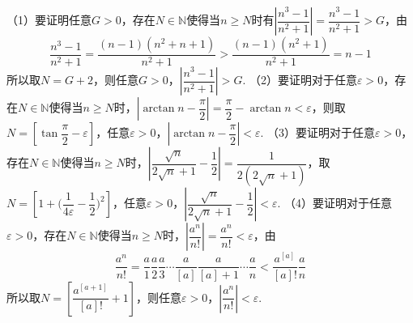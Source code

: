 \begin{solution}
    （1）要证明任意$G>0$，存在$N\in\mathbb{N}$使得当$n\geq N$时有$\left|\dfrac{n^3-1}{n^2+1}\right|=\dfrac{n^3-1}{n^2+1}>G$，由
    \[\dfrac{n^3-1}{n^2+1}=\dfrac{(n-1)(n^2+n+1)}{n^2+1}>\dfrac{(n-1)(n^2+1)}{n^2+1}=n-1\]所以取$N=G+2$，则任意$G>0$，$\left|\dfrac{n^3-1}{n^2+1}\right|>G$.\newline
    （2）要证明对于任意$\varepsilon>0$，存在$N\in\mathbb{N}$使得当$n\geq N$时，$\left|\arctan n-\dfrac{\pi}{2}\right|=\dfrac{\pi}{2}-\arctan n<\varepsilon$，则取$N=[\tan\dfrac{\pi}{2}-\varepsilon]$，任意$\varepsilon>0$，$\left|\arctan n-\dfrac{\pi}{2}\right|<\varepsilon$.\newline
    （3）要证明对于任意$\varepsilon>0$，存在$N\in\mathbb{N}$使得当$n\geq N$时，$\left|\dfrac{\sqrt{n}}{2\sqrt{n}+1}-\dfrac{1}{2}\right|=\dfrac{1}{2(2\sqrt{n}+1)}$，取$N=\left[1+\bigg(\dfrac{1}{4\varepsilon}-\dfrac12\bigg)^2\right]$，任意$\varepsilon>0$，$\left|\dfrac{\sqrt{n}}{2\sqrt{n}+1}-\dfrac{1}{2}\right|<\varepsilon$.\newline
    （4）要证明对于任意$\varepsilon>0$，存在$N\in\mathbb{N}$使得当$n\geq N$时，$\left|\dfrac{a^n}{n!}\right|=\dfrac{a^n}{n!}<\varepsilon$，由
    \[\dfrac{a^n}{n!}=\dfrac{a}{1}\dfrac{a}{2}\dfrac{a}{3}\cdots\dfrac{a}{[a]}\dfrac{a}{[a]+1}\cdots\dfrac{a}{n}<\dfrac{a^{[a]}}{[a]!}\dfrac{a}{n}\]
    所以取$N=\left[\dfrac{a^{[a+1]}}{[a]!}+1\right]$，则任意$\varepsilon>0$，$\left|\dfrac{a^n}{n!}\right|<\varepsilon$.    
\end{solution}